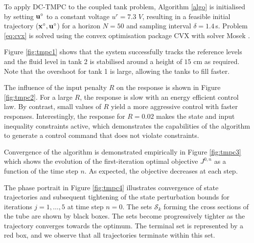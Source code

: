 \documentclass[a4paper, 10 pt, conference]{IEEEconf}
\def\S{\mathcal{S}}
\begin{document}
To apply DC-TMPC to the coupled tank problem, Algorithm \ref{algo} is initialised by setting ${\bf u}^\circ$ to a constant voltage $u^r = 7.3$ $V$, resulting in a feasible initial trajectory (${\bf x}^\circ, {\bf u}^\circ$) for a horizon $N=50$ and sampling interval $\delta=1.4$\,s. Problem \eqref{eq:cvx} is solved using the convex optimisation package CVX \cite{cvx} with solver Mosek \cite{mosek}. 

Figure \ref{fig:tmpc1} shows that the system successfully tracks the reference levels and the fluid level in tank 2 is stabilised around a height of $15$ cm as required. Note that the overshoot for tank 1 is large, allowing the tanks to fill faster. 

The influence of the input penalty $R$ on the response is shown in Figure \ref{fig:tmpc2}. For a large $R$, the response is slow with an energy efficient control law. By contrast, small values of $R$ yield a more aggressive control with faster responses. Interestingly, the response for $R=0.02$ makes the state and input inequality constraints active, which demonstrates the capabilities of the algorithm to generate a control command that does not violate constraints. 


Convergence of the algorithm is demonstrated empirically in Figure \ref{fig:tmpc3} which shows the evolution of the first-iteration optimal objective $J^{0,n}$ as a function of the time step $n$. As expected, the objective decreases at each step. 

The phase portrait in Figure \ref{fig:tmpc4} illustrates convergence of state trajectories and subsequent tightening of the state perturbation bounds for iterations $j=1,\ldots,5$ at time step $n=0$. The sets $\S_k$ forming the cross sections of the tube are shown by black boxes. The sets become progressively tighter as the trajectory converges towards the optimum. The terminal set is represented by a red  box, and we observe that all trajectories terminate within this set. 
\end{document}
